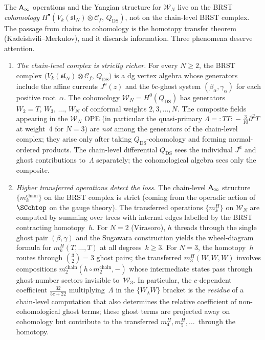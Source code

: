 \begin{remark}
\label{rem:ds-chain-vs-cohomology-wn}
The $\mathsf{A}_{\infty}$ operations and the Yangian structure for
$\mathcal{W}_N$ live on the BRST \emph{cohomology}
$H^\bullet(V_k(\mathfrak{sl}_N) \otimes \mathcal{C}_f,\,
Q_{\mathrm{DS}})$, not on the chain-level BRST complex. The
passage from chains to cohomology is the homotopy transfer
theorem (Kadeishvili--Merkulov), and it discards
information. Three phenomena deserve attention.

\begin{enumerate}[label=\textup{(\roman*)}]
\item \emph{The chain-level complex is strictly richer.}
 For every $N \geq 2$, the BRST complex
 $\bigl(V_k(\mathfrak{sl}_N) \otimes \mathcal{C}_f,\,
 Q_{\mathrm{DS}}\bigr)$ is a dg vertex algebra whose
 generators include the affine currents $J^a(z)$ and the
 $bc$-ghost system $(\beta_\alpha, \gamma_\alpha)$ for each
 positive root~$\alpha$. The cohomology
 $\mathcal{W}_N = H^0(Q_{\mathrm{DS}})$ has generators
 $W_2 = T,\, W_3,\, \ldots,\, W_N$ of conformal weights
 $2, 3, \ldots, N$. The composite fields appearing in the
 $\mathcal{W}_N$ OPE (in particular the quasi-primary
 $\Lambda = {:\!TT\!:} - \tfrac{3}{10}\partial^2 T$ at
 weight~$4$ for $N = 3$) are \emph{not} among the
 generators of the chain-level complex; they arise only
 after taking $Q_{\mathrm{DS}}$-cohomology and forming
 normal-ordered products. The chain-level differential
 $Q_{\mathrm{DS}}$ sees the individual $J^a$ and ghost
 contributions to~$\Lambda$ separately; the cohomological
 algebra sees only the composite.

\item \emph{Higher transferred operations detect the loss.}
 The chain-level $\mathsf{A}_{\infty}$ structure
 $\{m_k^{\mathrm{chain}}\}$ on the BRST complex is strict
 (coming from the operadic action of~$\SCchtop$ on the
 gauge theory). The transferred operations
 $\{m_k^H\}$ on $\mathcal{W}_N$ are computed by
 summing over trees with internal edges labelled by the
 BRST contracting homotopy~$h$. For $N = 2$ (Virasoro),
 $h$ threads through the single ghost pair
 $(\beta, \gamma)$ and the Sugawara construction yields the
 wheel-diagram formula for $m_k^H(T, \ldots, T)$ at all
 degrees~$k \geq 3$. For $N = 3$, the homotopy~$h$ routes
 through $\binom{3}{2} = 3$ ghost pairs; the transferred
 $m_3^H(W, W, W)$ involves compositions
 $m_2^{\mathrm{chain}}(h \circ m_2^{\mathrm{chain}}, -)$
 whose intermediate states pass through ghost-number sectors
 invisible to~$\mathcal{W}_3$. In particular, the
 $c$-dependent coefficient
 $\tfrac{32}{5c+22}$ multiplying~$\Lambda$ in the
 $\{W_\lambda W\}$ bracket is the \emph{residue} of a
 chain-level computation that also determines the
 relative coefficient of non-cohomological ghost terms;
 these ghost terms are projected away on cohomology but
 contribute to the transferred $m_4^H, m_5^H, \ldots\,$
 through the homotopy.


\end{enumerate}
\end{remark}
